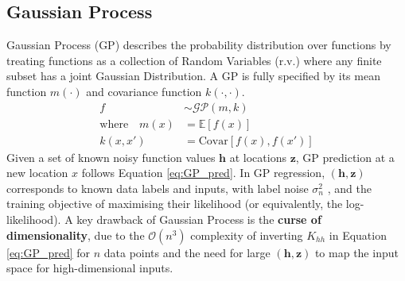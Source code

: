 \documentclass{article}
\begin{document}
\subsection{Gaussian Process}
Gaussian Process (GP) \cite{GaussianProcess} describes the probability distribution over functions by treating functions as a collection of Random Variables (r.v.) where any finite subset has a joint Gaussian Distribution. A GP is fully specified by its mean function $m(\cdot)$ and covariance function $k(\cdot, \cdot)$.
\begin{equation}
    \begin{aligned}
        f                                    & \sim\mathcal{GP}(m,k)
        \\
        \text{where} \quad m(x) & =\mathbb{E} [f(x)]
        \\
        k(x,x')    & =\text{Covar}[f(x), f(x')]
    \end{aligned}
    \label{eq:GP_def}
\end{equation}
Given a set of known noisy function values $\boldsymbol{h}$ at locations $\boldsymbol{z}$, GP prediction at a new location $x$ follows Equation \ref{eq:GP_pred}. In GP regression, $(\boldsymbol{h}, \boldsymbol{z})$ corresponds to known data labels and inputs, with label noise $\sigma_n^2$ , and the training objective of maximising their likelihood (or equivalently, the log-likelihood). A key drawback of Gaussian Process is the \textbf{curse of dimensionality}, due to the $\mathcal{O}(n^3)$ complexity of inverting $K_{hh}$ in Equation \ref{eq:GP_pred} for $n$ data points and the need for large $(\boldsymbol{h}, \boldsymbol{z})$ to map the input space for high-dimensional inputs.
\end{document}
